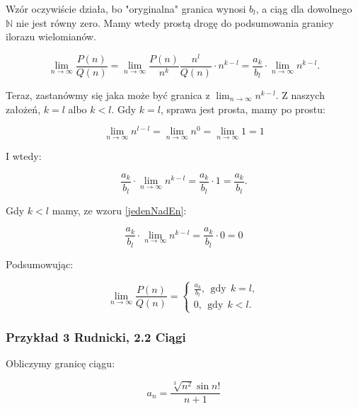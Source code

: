 \documentclass[a4paper,oneside,openright,11pt]{article}
\numberwithin{equation}{section}
\begin{document}
Wzór oczywiście działa, bo "oryginalna" granica wynosi $b_l$, a ciąg dla dowolnego $\mathbb{N}$ nie jest równy zero. Mamy wtedy prostą drogę do podsumowania granicy ilorazu wielomianów.

\begin{equation*}
    \lim_{n\to\infty} \frac{P(n)}{Q(n)} = \lim_{n\to\infty} \frac{P(n)}{n^k} \frac{n^l}{Q(n)} \cdot n^{k-l} = \frac{a_k}{b_l} \cdot \lim_{n\to\infty} n^{k-l}.
\end{equation*}

\vspace{5mm}

Teraz, zastanówmy się jaka może być granica z $\lim_{n\to\infty} n^{k-l}$. Z naszych założeń, $k = l$ albo $k < l$. Gdy $k=l$, sprawa jest prosta, mamy po prostu:

\begin{equation*}
    \lim_{n\to\infty} n^{l-l} = \lim_{n\to\infty} n^{0} = \lim_{n\to\infty} 1 = 1
\end{equation*}

I wtedy: 

\begin{equation*}
    \frac{a_k}{b_l} \cdot \lim_{n\to\infty} n^{k-l} = \frac{a_k}{b_l} \cdot 1 = \frac{a_k}{b_l}.
\end{equation*}


Gdy $k < l$ mamy, ze wzoru \ref{jedenNadEn}:

\begin{equation*}
    \frac{a_k}{b_l} \cdot \lim_{n\to\infty} n^{k-l} = \frac{a_k}{b_l} \cdot 0 = 0
\end{equation*}

Podsumowując:

\begin{equation*}
    \lim_{n\to\infty} \frac{P(n)}{Q(n)} =
    \begin{cases}
        \frac{a_k}{b_l}, \ \ \mbox{gdy} \ \ k = l, \\
        0, \ \ \mbox{gdy} \ \ k < l.
    \end{cases}
\end{equation*}

\subsubsection{Przykład 3 Rudnicki, 2.2 Ciągi}

Obliczymy granicę ciągu:

\begin{equation*}
    a_n = \frac{\sqrt[3]{n^2} \sin n!}{n+1}
\end{equation*}
\end{document}
